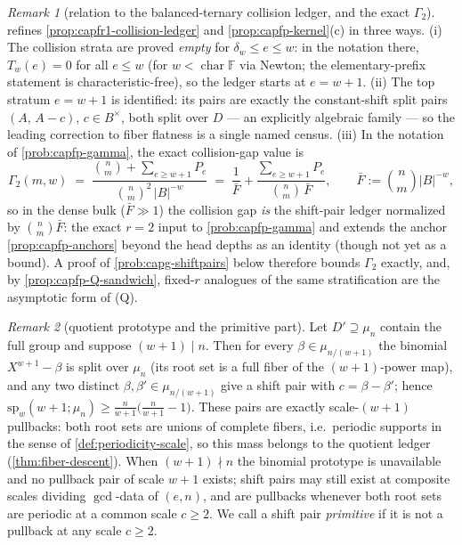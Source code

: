 \documentclass[11pt]{article}
\theoremstyle{definition}
\theoremstyle{remark}
\newtheorem{remark}[remark]{Remark}
\newcommand{\F}{\mathbb{F}}
\newcommand{\B}{B}
\begin{document}
\begin{remark}[relation to the balanced-ternary collision ledger, and
the exact $\Gamma_2$]\label{rem:capg-secondmom-rel}
 refines
\cref{prop:capfr1-collision-ledger} and
\cref{prop:capfp-kernel}\textup{(c)} in three ways.  \textup{(i)}  The
collision strata are proved \emph{empty} for
$\delta_w\le e\le w$: in the notation there, $T_w(e)=0$ for all
$e\le w$ (for $w<\operatorname{char}\F$ via Newton; the
elementary-prefix statement is characteristic-free), so the ledger
starts at $e=w+1$.  \textup{(ii)}  The top stratum $e=w+1$ is
identified: its pairs are exactly the constant-shift split pairs
$(A,\,A-c)$, $c\in\B^{\times}$, both split over $D$ --- an explicitly
algebraic family --- so the leading correction to fiber flatness is a
single named census.  \textup{(iii)}  In the notation of
\cref{prob:capfp-gamma}, the exact collision-gap value is
\[
        \Gamma_2(m,w)
        \;=\;
        \frac{\binom nm+\sum_{e\ge w+1}P_e}
             {\binom nm^{2}\,|\B|^{-w}}
        \;=\;
        \frac1{\bar F}
        +\frac{\sum_{e\ge w+1}P_e}{\binom nm\,\bar F},
        \qquad
        \bar F:=\binom nm|\B|^{-w},
\]
so in the dense bulk ($\bar F\gg1$) the collision gap \emph{is} the
shift-pair ledger normalized by $\binom nm\bar F$: the exact $r=2$ input
to
\cref{prob:capfp-gamma} and extends the anchor
\cref{prop:capfp-anchors} beyond the head depths as an identity (though
not yet as a bound).  A proof of \cref{prob:capg-shiftpairs} below
therefore bounds $\Gamma_2$ exactly, and, by
\cref{prop:capfp-Q-sandwich}, fixed-$r$ analogues of the same
stratification are the asymptotic form of \textup{(Q)}.
\end{remark}

\begin{remark}[quotient prototype and the primitive part]\label{rem:capg-prototype}
Let $D'\supseteq\mu_n$ contain the full group and suppose $(w+1)\mid n$.
Then for every $\beta\in\mu_{n/(w+1)}$ the binomial $X^{w+1}-\beta$ is split
over $\mu_n$ (its root set is a full fiber of the $(w+1)$-power map), and
any two distinct $\beta,\beta'\in\mu_{n/(w+1)}$ give a shift pair with
$c=\beta-\beta'$; hence
$\mathrm{sp}_w(w+1;\mu_n)\geq \tfrac{n}{w+1}\big(\tfrac{n}{w+1}-1\big)$.
These pairs are exactly scale-$(w+1)$ pullbacks: both root sets are unions
of complete fibers, i.e.\ periodic supports in the sense of
\cref{def:periodicity-scale}, so this mass belongs to the quotient ledger
(\cref{thm:fiber-descent}).  When $(w+1)\nmid n$ the binomial prototype is
unavailable and no pullback pair of scale $w+1$ exists; shift pairs may
still exist at composite scales dividing $\gcd$-data of $(e,n)$, and are
pullbacks whenever both root sets are periodic at a common scale
$c\geq 2$.  We call a shift pair \emph{primitive} if it is not a pullback at
any scale $c\geq 2$.
\end{remark}
\end{document}
